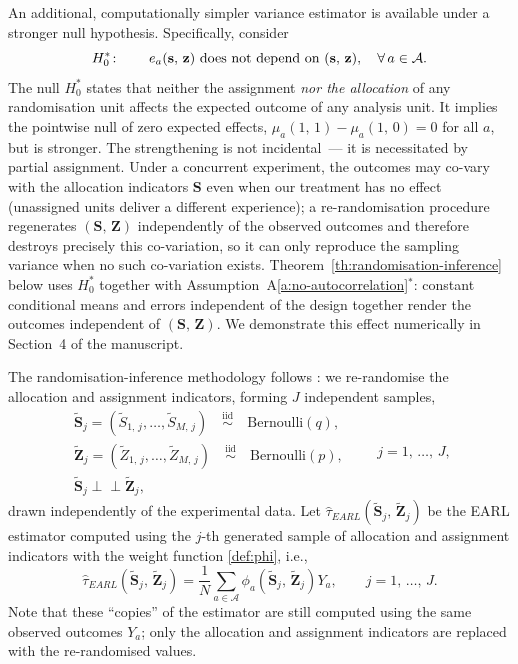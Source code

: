 \documentclass[sigconf,nonacm]{acmart}
\newcommand{\iidsim}{{\stackrel{\mathrm{iid}}{\sim}}}
\newcommand{\ind}{\perp\!\!\!\perp}
\begin{document}
An additional, computationally simpler variance estimator is available under a stronger null hypothesis. Specifically, consider
\begin{equation}\label{def:strong-null}
    H_0^*\colon\qquad e_a(\mathbf s,\,\mathbf z)\ \textup{does not depend on }(\mathbf s,\,\mathbf z),\quad \forall\,a\in\mathcal A.
\end{equation}
The null $H_0^*$ states that neither the assignment \emph{nor the allocation} of any randomisation unit affects the expected outcome of any analysis unit. It implies the pointwise null of zero expected effects, $\mu_a(1,\,1)-\mu_a(1,\,0)=0$ for all $a$, but is stronger. The strengthening is not incidental~--- it is necessitated by partial assignment. Under a concurrent experiment, the outcomes may co-vary with the allocation indicators $\mathbf S$ even when our treatment has no effect (unassigned units deliver a different experience); a re-randomisation procedure regenerates $(\mathbf S,\,\mathbf Z)$ independently of the observed outcomes and therefore destroys precisely this co-variation, so it can only reproduce the sampling variance when no such co-variation exists. Theorem~\ref{th:randomisation-inference} below uses $H_0^*$ together with Assumption~A\ref{a:no-autocorrelation}$^*$: constant conditional means and errors independent of the design together render the outcomes independent of $(\mathbf S,\,\mathbf Z)$. We demonstrate this effect numerically in Section~4 of the manuscript.

The randomisation-inference methodology follows \cite[Section~4]{shi2025scalableanalysisbipartiteexperiments}: we re-randomise the allocation and assignment indicators, forming $J$ independent samples,
\begin{equation}\label{def:S-Z-samples}
    \begin{array}{c}
        \tilde{\mathbf{S}}_j = (\tilde S_{1,\,j},\ldots,\tilde S_{M,\,j}) \quad \iidsim \quad \mathrm{Bernoulli}(q),\\
        \tilde{\mathbf Z}_j = (\tilde Z_{1,\,j},\ldots,\tilde Z_{M,\,j}) \quad \iidsim \quad \mathrm{Bernoulli}(p),\\
        \tilde{\mathbf{S}}_j\ind \tilde{\mathbf Z}_j,
    \end{array}\qquad j=1,\,\ldots,\,J,
\end{equation}
drawn independently of the experimental data. Let $\hat\tau^{\phantom{1}}_{EARL}(\tilde {\mathbf S}_j,\,\tilde{\mathbf Z}_j)$ be the EARL estimator computed using the $j$-th generated sample of allocation and assignment indicators with the weight function \eqref{def:phi}, i.e.,
$$
    \hat\tau^{\phantom{1}}_{EARL}(\tilde {\mathbf S}_j,\,\tilde{\mathbf Z}_j) = \frac 1 N \sum_{a\in\mathcal{A}}\phi_a(\tilde {\mathbf S}_j,\,\tilde{\mathbf Z}_j)Y_a,\qquad j=1,\,\ldots,\,J.
$$
Note that these ``copies'' of the estimator are still computed using the same observed outcomes $Y_a$; only the allocation and assignment indicators are replaced with the re-randomised values.
\end{document}
